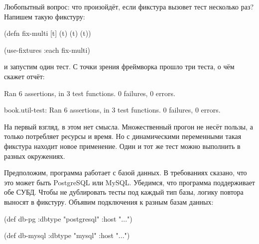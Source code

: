 \label{multi-fixture}


Любопытный вопрос: что произойдёт, если фикстура вызовет тест несколько раз?
Напишем такую фикстуру:

\begin{english}
  \begin{clojure}
(defn fix-multi [t]
  (t) (t) (t))

(use-fixtures :each fix-multi)
  \end{clojure}
\end{english}

\noindent
и запустим один тест. С точки зрения фреймворка прошло три теста, о чём скажет
отчёт:

\ifnarrow

\begin{english}
  \begin{text}
Ran 6 assertions, in 3 test functions.
0 failures, 0 errors.
  \end{text}
\end{english}

\else

\begin{english}
  \begin{text}
book.util-test: Ran 6 assertions, in 3 test functions.
0 failures, 0 errors.
  \end{text}
\end{english}

\fi

На первый взгляд, в этом нет смысла. Множественный прогон не несёт пользы, а
только потребляет ресурсы и время. Но с динамическими переменными такая фикстура
находит новое применение. Один и тот же тест можно выполнить в разных
окружениях.

Предположим, программа работает с базой данных. В требованиях сказано, что это
может быть PostgreSQL или MySQL. Убедимся, что программа поддерживает обе
СУБД. Чтобы не дублировать тесты под каждый тип базы, логику повтора выносят в
фикстуру. Объявим подключения к разным базам данных:

\ifnarrow

\begin{english}
  \begin{clojure}
(def db-pg
  {:dbtype "postgresql" :host "..."})

(def db-mysql
  {:dbtype "mysql" :host "..."})
  \end{clojure}
\end{english}

